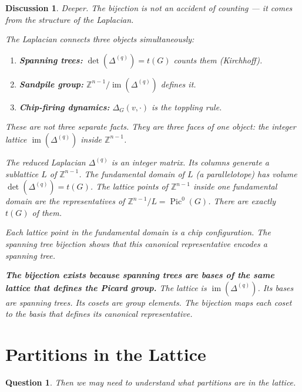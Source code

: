 \documentclass[11pt]{article}
\newcommand{\Z}{\mathbb{Z}}
\newcommand{\Pic}{\operatorname{Pic}^0}
\newtheorem{question}{Question}
\newtheorem{answer}{Discussion}
\begin{document}
\begin{answer}
Deeper. The bijection is not an accident of counting --- it comes from the
structure of the Laplacian.

The Laplacian connects three objects simultaneously:
\begin{enumerate}
  \item \textbf{Spanning trees:} $\det(\Delta^{(q)}) = t(G)$ counts them
    (Kirchhoff).
  \item \textbf{Sandpile group:} $\Z^{n-1} / \operatorname{im}(\Delta^{(q)})$
    defines it.
  \item \textbf{Chip-firing dynamics:} $\Delta_G(v, \cdot)$ is the toppling
    rule.
\end{enumerate}
These are not three separate facts. They are three faces of one object: the
integer lattice $\operatorname{im}(\Delta^{(q)})$ inside $\Z^{n-1}$.

The reduced Laplacian $\Delta^{(q)}$ is an integer matrix. Its columns
generate a sublattice $L$ of $\Z^{n-1}$. The fundamental domain of $L$ (a
parallelotope) has volume $\det(\Delta^{(q)}) = t(G)$. The lattice points of
$\Z^{n-1}$ inside one fundamental domain are the representatives of
$\Z^{n-1}/L = \Pic(G)$. There are exactly $t(G)$ of them.

Each lattice point in the fundamental domain \emph{is} a chip configuration.
The spanning tree bijection shows that this canonical representative encodes a
spanning tree.

\textbf{The bijection exists because spanning trees are bases of the same
lattice that defines the Picard group.} The lattice is
$\operatorname{im}(\Delta^{(q)})$. Its bases are spanning trees. Its cosets
are group elements. The bijection maps each coset to the basis that defines
its canonical representative.
\end{answer}


\section{Partitions in the Lattice}

\begin{question}
Then we may need to understand what partitions are in the lattice.
\end{question}
\end{document}
